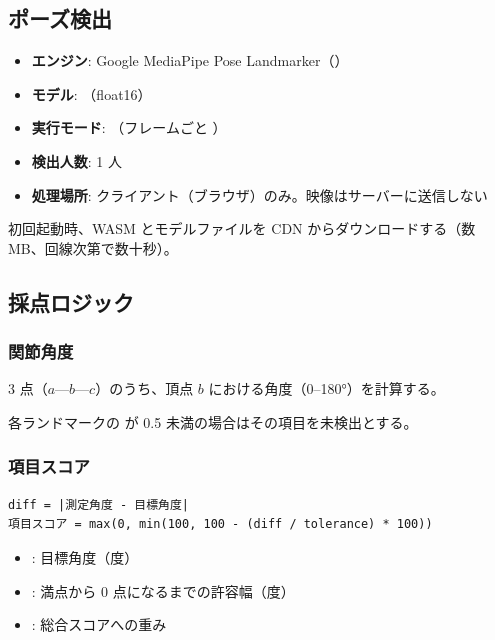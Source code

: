 \documentclass[a4paper,11pt]{ltjsarticle}
\begin{document}
\subsection{ポーズ検出}

\begin{itemize}
  \item \textbf{エンジン}: Google MediaPipe Pose Landmarker（）
  \item \textbf{モデル}: （float16）
  \item \textbf{実行モード}: （フレームごと ）
  \item \textbf{検出人数}: 1 人
  \item \textbf{処理場所}: クライアント（ブラウザ）のみ。映像はサーバーに送信しない
\end{itemize}

初回起動時、WASM とモデルファイルを CDN からダウンロードする（数\,MB、回線次第で数十秒）。

\subsection{採点ロジック}

\subsubsection{関節角度}

3 点（$a$---$b$---$c$）のうち、頂点 $b$ における角度（0--180°）を計算する。

各ランドマークの  が 0.5 未満の場合はその項目を未検出とする。

\subsubsection{項目スコア}

\begin{lstlisting}
diff = |測定角度 - 目標角度|
項目スコア = max(0, min(100, 100 - (diff / tolerance) * 100))
\end{lstlisting}

\begin{itemize}
  \item {}: 目標角度（度）
  \item {}: 満点から 0 点になるまでの許容幅（度）
  \item {}: 総合スコアへの重み
\end{itemize}
\end{document}
